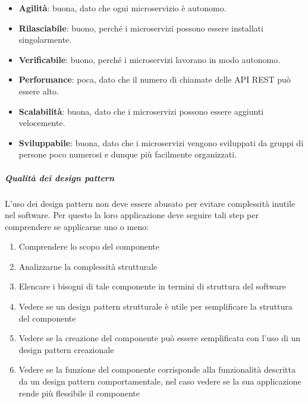 \begin{itemize}
                \begin{itemize}
                    \item \textbf{Agilità}: buona, dato che ogni microservizio è autonomo.
                    \item \textbf{Rilasciabile}: buono, perché i microservizi possono essere installati singolarmente.
                    \item \textbf{Verificabile}: buono, perché i microservizi lavorano in modo autonomo.
                    \item \textbf{Performance}: poca, dato che il numero di chiamate delle API REST può essere alto.
                    \item \textbf{Scalabilità}: buona, dato che i microservizi possono essere aggiunti velocemente.
                    \item \textbf{Sviluppabile}: buona, dato che i microservizi vengono sviluppati da gruppi di persone poco numerosi e dunque più facilmente organizzati.
                \end{itemize}
        \end{itemize}

        \subparagraph{Qualità dei design pattern} \label{PP:progettazione:designPattern}
        L'uso dei design pattern non deve essere abusato per evitare complessità inutile nel software. Per questo la loro applicazione deve seguire tali step per comprendere se applicarne uno o meno:
        \begin{enumerate}
            \item Comprendere lo scopo del componente
            \item Analizzarne la complessità strutturale
            \item Elencare i bisogni di tale componente in termini di struttura del software
            \item Vedere se un design pattern strutturale è utile per semplificare la struttura del componente
            \item Vedere se la creazione del componente può essere semplificata con l'uso di un design pattern creazionale
            \item Vedere se la funzione del componente corrisponde alla funzionalità descritta da un design pattern comportamentale, nel caso vedere se la sua applicazione rende più flessibile il componente
        \end{enumerate}
        
